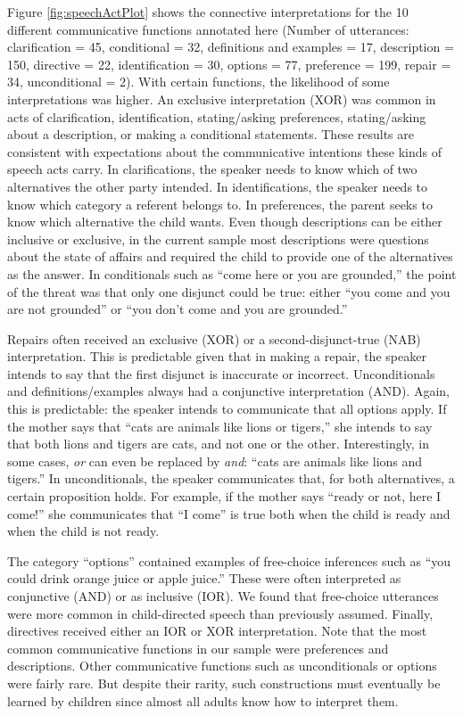 \documentclass[
  english,
  ,man,floatsintext]{apa6}
\begin{document}
Figure \ref{fig:speechActPlot} shows the connective interpretations for the 10 different communicative functions annotated here (Number of utterances: clarification = 45, conditional = 32, definitions and examples = 17, description = 150, directive = 22, identification = 30, options = 77, preference = 199, repair = 34, unconditional = 2). With certain functions, the likelihood of some interpretations was higher. An exclusive interpretation (XOR) was common in acts of clarification, identification, stating/asking preferences, stating/asking about a description, or making a conditional statements. These results are consistent with expectations about the communicative intentions these kinds of speech acts carry. In clarifications, the speaker needs to know which of two alternatives the other party intended. In identifications, the speaker needs to know which category a referent belongs to. In preferences, the parent seeks to know which alternative the child wants. Even though descriptions can be either inclusive or exclusive, in the current sample most descriptions were questions about the state of affairs and required the child to provide one of the alternatives as the answer. In conditionals such as ``come here or you are grounded,'' the point of the threat was that only one disjunct could be true: either ``you come and you are not grounded'' or ``you don't come and you are grounded.''

Repairs often received an exclusive (XOR) or a second-disjunct-true (NAB) interpretation. This is predictable given that in making a repair, the speaker intends to say that the first disjunct is inaccurate or incorrect. Unconditionals and definitions/examples always had a conjunctive interpretation (AND). Again, this is predictable: the speaker intends to communicate that all options apply. If the mother says that ``cats are animals like lions or tigers,'' she intends to say that both lions and tigers are cats, and not one or the other. Interestingly, in some cases, \emph{or} can even be replaced by \emph{and}: ``cats are animals like lions and tigers.'' In unconditionals, the speaker communicates that, for both alternatives, a certain proposition holds. For example, if the mother says ``ready or not, here I come!'' she communicates that ``I come'' is true both when the child is ready and when the child is not ready.

The category ``options'' contained examples of free-choice inferences such as ``you could drink orange juice or apple juice.'' These were often interpreted as conjunctive (AND) or as inclusive (IOR). We found that free-choice utterances were more common in child-directed speech than previously assumed. Finally, directives received either an IOR or XOR interpretation. Note that the most common communicative functions in our sample were preferences and descriptions. Other communicative functions such as unconditionals or options were fairly rare. But despite their rarity, such constructions must eventually be learned by children since almost all adults know how to interpret them.
\end{document}
